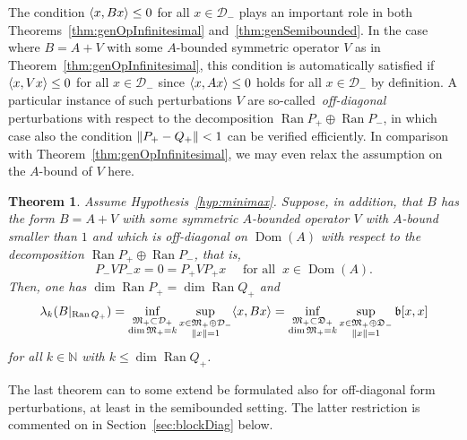 \documentclass[11pt,a4paper]{amsart}
\numberwithin{equation}{section}
\DeclareMathOperator{\Ran}{Ran}
\DeclareMathOperator{\Dom}{Dom}
\DeclarePairedDelimiter{\norm}{\lVert}{\rVert}
\DeclarePairedDelimiter{\scprod}{\langle}{\rangle}
\newcommand{\NN}{\mathbb{N}}
\newcommand{\cD}{{\mathcal D}}
\newcommand{\fb}{{\mathfrak b}}
\newcommand{\fD}{{\mathfrak D}}
\newcommand{\fM}{{\mathfrak M}}
\theoremstyle{plain}
\newtheorem{theorem}{Theorem}[section]
\theoremstyle{definition}
\theoremstyle{remark}
\begin{document}
The condition $\scprod{ x , Bx } \le 0$ for all $x \in \cD_-$ plays an important role in both
Theorems~\ref{thm:genOpInfinitesimal} and~\ref{thm:genSemibounded}. In the case where $B = A + V$ with some $A$-bounded symmetric
operator $V$ as in Theorem~\ref{thm:genOpInfinitesimal}, this condition is automatically satisfied if $\scprod{ x , Vx } \le 0$
for all $x \in \cD_-$ since $\scprod{ x , Ax } \le 0$ holds for all $x \in \cD_-$ by definition. A particular instance of such
perturbations $V$ are so-called~\emph{off-diagonal} perturbations with respect to the decomposition $\Ran P_+ \oplus \Ran P_-$,
in which case also the condition $\norm{P_+-Q_+} < 1$ can be verified efficiently. In comparison with
Theorem~\ref{thm:genOpInfinitesimal}, we may even relax the assumption on the $A$-bound of $V$ here.

\begin{theorem}\label{thm:offdiagOp}
  Assume Hypothesis~\ref{hyp:minimax}. Suppose, in addition, that $B$ has the form $B = A + V$ with some symmetric $A$-bounded
  operator $V$ with $A$-bound smaller than $1$ and which is off-diagonal on $\Dom(A)$ with respect to the decomposition
  $\Ran P_+ \oplus \Ran P_-$, that is,
  \begin{equation*}
    P_-VP_- x = 0 = P_+VP_+ x \quad\text{ for all }\ x \in \Dom(A).
  \end{equation*}
  Then, one has $\dim\Ran P_+ = \dim\Ran Q_+$ and
  \begin{equation*}
    \lambda_k(B|_{\Ran Q_+})
    =
    \inf_{\substack{\fM_+\subset\cD_+\\ \dim\fM_+=k}} \sup_{\substack{x\in\fM_+ \oplus \cD_-\\ \norm{x}=1}} \scprod{ x , Bx }
    =
    \inf_{\substack{\fM_+\subset\fD_+\\ \dim\fM_+=k}} \sup_{\substack{x\in\fM_+ \oplus \fD_-\\ \norm{x}=1}} \fb[x,x]
  \end{equation*}
  for all $k \in \NN$ with $k \le \dim\Ran Q_+$.
\end{theorem}

The last theorem can to some extend be formulated also for off-diagonal form perturbations, at least in the semibounded setting.
The latter restriction is commented on in Section~\ref{sec:blockDiag} below.
\end{document}
